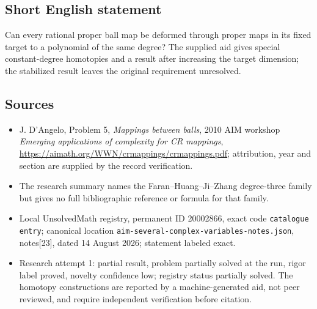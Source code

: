 \documentclass[11pt]{article}
\begin{document}
\subsection{Short English statement}
Can every rational proper ball map be deformed through proper maps in its fixed target to a polynomial of the same degree? The supplied aid gives special constant-degree homotopies and a result after increasing the target dimension; the stabilized result leaves the original requirement unresolved.
\subsection{Sources}
\begin{itemize}
\item J. D'Angelo, Problem 5, \emph{Mappings between balls}, 2010 AIM workshop \emph{Emerging applications of complexity for CR mappings}, \url{https://aimath.org/WWN/crmappings/crmappings.pdf}; attribution, year and section are supplied by the record verification.
\item The research summary names the Faran--Huang--Ji--Zhang degree-three family but gives no full bibliographic reference or formula for that family.
\item Local UnsolvedMath registry, permanent ID 20002866, exact code \texttt{catalogue entry}; canonical location \texttt{aim-several-complex-variables-notes.json}, notes[23], dated 14 August 2026; statement labeled exact.
\item Research attempt 1: partial result, problem partially solved at the run, rigor label proved, novelty confidence low; registry status partially solved. The homotopy constructions are reported by a machine-generated aid, not peer reviewed, and require independent verification before citation.
\end{itemize}
\end{document}

